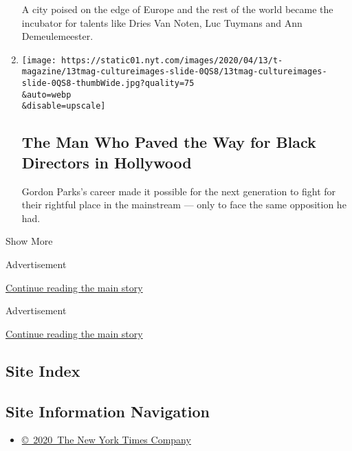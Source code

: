 \begin{enumerate}
  A city poised on the edge of Europe and the rest of the world became
  the incubator for talents like Dries Van Noten, Luc Tuymans and Ann
  Demeulemeester.
\item
  \href{/interactive/2020/04/13/t-magazine/gordon-parks.html}{}

  \texttt{[image: https://static01.nyt.com/images/2020/04/13/t-magazine/13tmag-cultureimages-slide-0QS8/13tmag-cultureimages-slide-0QS8-thumbWide.jpg?quality=75\\\&auto=webp\\\&disable=upscale]}

  \hypertarget{the-man-who-paved-the-way-for-black-directors-in-hollywood}{%
  \subsection{The Man Who Paved the Way for Black Directors in
  Hollywood}\label{the-man-who-paved-the-way-for-black-directors-in-hollywood}}

  Gordon Parks's career made it possible for the next generation to
  fight for their rightful place in the mainstream --- only to face the
  same opposition he had.
\end{enumerate}

Show More

Advertisement

\protect\hyperlink{after-mid2}{Continue reading the main story}

Advertisement

\protect\hyperlink{after-mktg}{Continue reading the main story}

\hypertarget{site-index}{%
\subsection{Site Index}\label{site-index}}

\hypertarget{site-information-navigation}{%
\subsection{Site Information
Navigation}\label{site-information-navigation}}

\begin{itemize}
\tightlist
\item
  \href{https://help.nytimes.com/hc/en-us/articles/115014792127-Copyright-notice}{©~2020~The
  New York Times Company}
\end{itemize}

